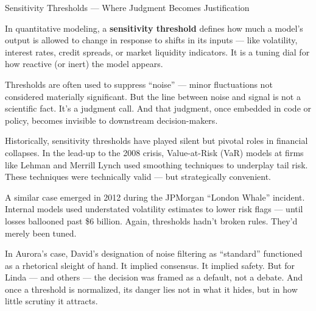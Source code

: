\begin{TechnicalSidebar}{Sensitivity Thresholds — Where Judgment Becomes Justification}

  In quantitative modeling, a \textbf{sensitivity threshold} defines how much a model’s output is allowed 
  to change in response to shifts in its inputs — like volatility, interest rates, credit spreads, or market 
  liquidity indicators. It is a tuning dial for how reactive (or inert) the model appears.

  \medskip
  
  Thresholds are often used to suppress ``noise'' — minor fluctuations not considered materially significant. 
  But the line between noise and signal is not a scientific fact. It’s a judgment call. And that judgment, 
  once embedded in code or policy, becomes invisible to downstream decision-makers.

  \medskip
  
  Historically, sensitivity thresholds have played silent but pivotal roles in financial collapses. In the 
  lead-up to the 2008 crisis, Value-at-Risk (VaR) models at firms like Lehman and Merrill Lynch used smoothing 
  techniques to underplay tail risk. These techniques were technically valid — but strategically convenient.

  \medskip
  
  A similar case emerged in 2012 during the JPMorgan ``London Whale'' incident. Internal models used 
  understated volatility estimates to lower risk flags — until losses ballooned past \$6 billion. Again, 
  thresholds hadn’t broken rules. They’d merely been tuned.

  \medskip
  
  In Aurora’s case, David’s designation of noise filtering as ``standard'' functioned as a rhetorical sleight 
  of hand. It implied consensus. It implied safety. But for Linda — and others — the decision was framed as a 
  default, not a debate. And once a threshold is normalized, its danger lies not in what it hides, but in 
  how little scrutiny it attracts.
  
\end{TechnicalSidebar}
  

